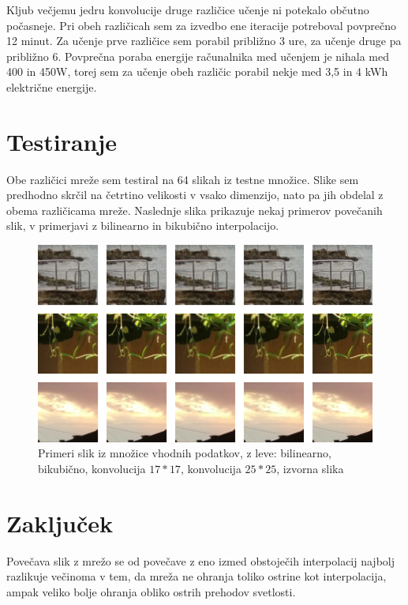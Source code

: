 \documentclass[a4paper,11pt]{article}
\begin{document}
Kljub večjemu jedru konvolucije druge različice učenje ni potekalo občutno počasneje.
Pri obeh različicah sem za izvedbo ene iteracije potreboval povprečno 12 minut.
Za učenje prve različice sem porabil približno 3 ure, za učenje druge pa približno 6.
Povprečna poraba energije računalnika med učenjem je nihala med 400 in 450W, torej sem za učenje obeh različic porabil nekje med 3,5 in 4 kWh električne
	energije.

\section{Testiranje}

Obe različici mreže sem testiral na 64 slikah iz testne množice.
Slike sem predhodno skrčil na četrtino velikosti v vsako dimenzijo, nato pa jih obdelal z obema različicama mreže.
Naslednje slika prikazuje nekaj primerov povečanih slik, v primerjavi z bilinearno in bikubično interpolacijo.

\begin{figure}[htbp]
\begin{center}
\includegraphics[scale=0.231]{picture_comparison.jpg}
\caption{Primeri slik iz množice vhodnih podatkov, z leve: bilinearno, bikubično, konvolucija $17 * 17$, konvolucija $25 * 25$, izvorna slika}
\label{slika1}
\end{center}
\end{figure}

\section{Zaključek}

Povečava slik z mrežo se od povečave z eno izmed obstoječih interpolacij najbolj razlikuje večinoma v tem, da mreža ne ohranja toliko ostrine kot 
	interpolacija, ampak veliko bolje ohranja obliko ostrih prehodov svetlosti.
\end{document}
